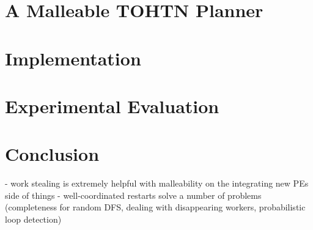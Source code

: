 \documentclass[enabledeprecatedfontcommands,12pt,a4paper,twoside]{scrartcl}
\numberwithin{equation}{section}
\begin{document}
\section{A Malleable TOHTN Planner}
\label{malleable: overview}


\pagebreak
\section{Implementation}


\clearpage
\pagebreak
\section{Experimental Evaluation}


\pagebreak
\section{Conclusion}

- work stealing is extremely helpful with malleability on the integrating new PEs side of things
- well-coordinated restarts solve a number of problems (completeness for random DFS, dealing with disappearing workers, probabilistic loop detection)



\clearpage




\end{document}
